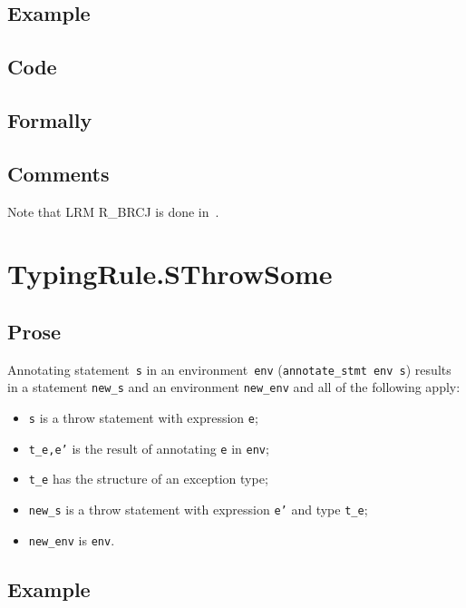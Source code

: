 \documentclass{book}
\begin{document}
  \subsection{Example}

  \subsection{Code}

\begin{emptyformal}
    \subsection{Formally}
\end{emptyformal}

\subsection{Comments}
  Note that LRM R\_BRCJ is done in~\cite[SemanticsRule.TopLevel]{ASLSemanticsReference}.

\section{TypingRule.SThrowSome \label{sec:TypingRule.SThrowSome}}

  \subsection{Prose}
Annotating statement~\texttt{s} in an environment~\texttt{env}
(\texttt{annotate\_stmt env s}) results in a statement \texttt{new\_s} and an
environment \texttt{new\_env} and all of the following apply:
   \begin{itemize}
   \item \texttt{s} is a throw statement with expression \texttt{e};
   \item \texttt{t\_e,e'} is the result of annotating \texttt{e} in \texttt{env};
   \item \texttt{t\_e} has the structure of an exception type;
   \item \texttt{new\_s} is a throw statement with expression \texttt{e'} and type \texttt{t\_e};
   \item \texttt{new\_env} is \texttt{env}.
   \end{itemize}

  \subsection{Example}
\end{document}
